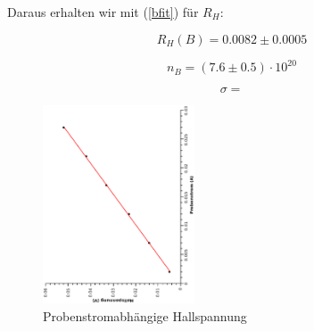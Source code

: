 \documentclass[12pt,a4paper,twopage]{article}
\begin{document}
Daraus erhalten wir mit (\ref{bfit}) für $R_H$:

\begin{center}
$$ \boxed{ R_H(B) = 0.0082 \pm 0.0005 } $$
\end{center}

\begin{center}
$$ \boxed{ n_{B} = (7.6 \pm 0.5) \cdot 10^20  } $$
\end{center}

$$ \sigma = $$



\pagebreak

\begin{figure}[H]
\begin{center}
\includegraphics[width=0.4\textwidth, angle=-90]{probenstrom.eps}
\caption{Probenstromabhängige Hallspannung}
\end{center}
\end{figure}
\end{document}
